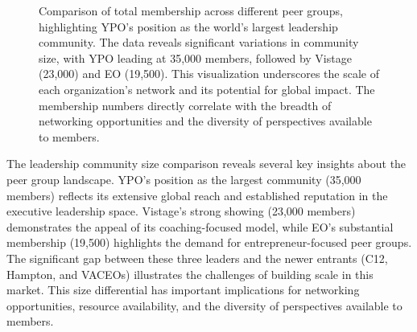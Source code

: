 \documentclass[conference]{IEEEtran}
\begin{document}
\begin{figure}[t]
\centering
{}
\caption{Comparison of total membership across different peer groups, highlighting YPO's position as the world's largest leadership community. The data reveals significant variations in community size, with YPO leading at 35,000 members, followed by Vistage (23,000) and EO (19,500). This visualization underscores the scale of each organization's network and its potential for global impact. The membership numbers directly correlate with the breadth of networking opportunities and the diversity of perspectives available to members.}
\label{fig:community_size}
\end{figure}

The leadership community size comparison reveals several key insights about the peer group landscape. YPO's position as the largest community (35,000 members) reflects its extensive global reach and established reputation in the executive leadership space. Vistage's strong showing (23,000 members) demonstrates the appeal of its coaching-focused model, while EO's substantial membership (19,500) highlights the demand for entrepreneur-focused peer groups. The significant gap between these three leaders and the newer entrants (C12, Hampton, and VACEOs) illustrates the challenges of building scale in this market. This size differential has important implications for networking opportunities, resource availability, and the diversity of perspectives available to members.
\end{document}
